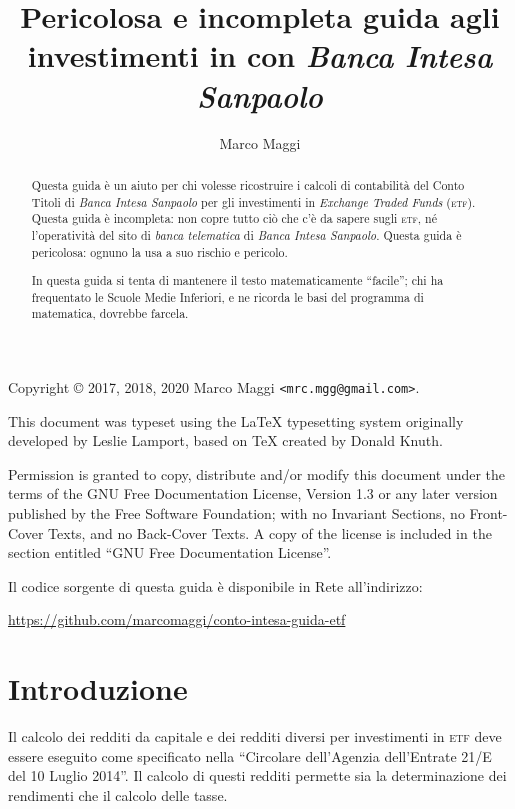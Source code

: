 \documentclass[12pt,a4paper]{article}
\author{Marco Maggi}
\title{Pericolosa e incompleta guida agli investimenti in \Etf{} con \emph{Banca Intesa Sanpaolo}}
\newcommand{\Parentesi}[1]{(#1)}
\newcommand{\Etf}[1]{\textsc{etf}}
\begin{document}
\maketitle

\begin{abstract}
  \noindent
  Questa guida è un  aiuto per chi volesse ricostruire i calcoli di  contabilità del Conto Titoli di
  \emph{Banca   Intesa   Sanpaolo}   per   gli  investimenti   in   \emph{Exchange   Traded   Funds}
  \Parentesi{\Etf{}}.   Questa guida  è incompleta:  non copre  tutto ciò  che c'è  da sapere  sugli
  \Etf{}, né  l'operatività del  sito di  \emph{banca telematica}  di \emph{Banca  Intesa Sanpaolo}.
  Questa guida è pericolosa: ognuno la usa a suo rischio e pericolo.

  In questa guida si  tenta di mantenere il testo matematicamente ``facile'';  chi ha frequentato le
  Scuole Medie Inferiori, e ne ricorda le basi del programma di matematica, dovrebbe farcela.
\end{abstract}

\tableofcontents

\newpage{}

\noindent
Copyright \copyright{} 2017, 2018, 2020 Marco Maggi \texttt{<mrc.mgg@gmail.com>}.

This  document was  typeset using  the \LaTeX{}  typesetting system  originally developed  by Leslie
Lamport, based on \TeX{} created by Donald Knuth.

Permission is  granted to copy, distribute  and/or modify this document  under the terms of  the GNU
Free  Documentation License,  Version  1.3 or  any  later  version published  by  the Free  Software
Foundation; with no  Invariant Sections, no Front-Cover  Texts, and no Back-Cover Texts.   A copy of
the license is included in the section entitled ``GNU Free Documentation License''.

Il codice sorgente di questa guida è disponibile in Rete all'indirizzo:
\begin{center}
  \url{https://github.com/marcomaggi/conto-intesa-guida-etf}
\end{center}

\newpage{}

\section{Introduzione}


Il calcolo  dei redditi da  capitale e dei  redditi diversi per  investimenti in \Etf{}  deve essere
eseguito come specificato nella ``Circolare dell'Agenzia dell'Entrate 21/E del 10 Luglio 2014''.  Il
calcolo di questi redditi permette sia la determinazione dei rendimenti che il calcolo delle tasse.
\end{document}

